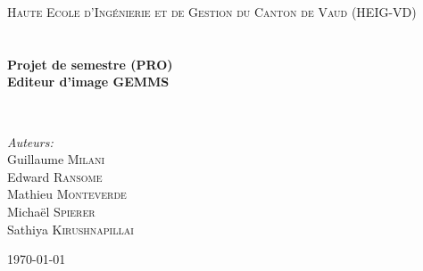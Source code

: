 \begin{titlepage}
\begin{center}


\textsc{\LARGE Haute Ecole d'Ingénierie et de Gestion du Canton de Vaud (HEIG-VD)}\\[1.8cm]

\textsc{\Large }\\[0.5cm]

\HRule \\[0.4cm]

{\huge \bfseries Projet de semestre (PRO)\\
Editeur d'image GEMMS \\[0.5cm] }

\HRule \\[1.5cm]

\begin{minipage}{0.4\textwidth}
\begin{flushleft} \large
\emph{Auteurs:}\\
Guillaume \textsc{Milani}\\
Edward \textsc{Ransome}\\
Mathieu \textsc{Monteverde}\\
Michaël \textsc{Spierer}\\
Sathiya \textsc{Kirushnapillai}
\end{flushleft}
\end{minipage}
\begin{minipage}{0.4\textwidth}
\begin{flushright} \large
\end{flushright}
\end{minipage}

\vfill

{\large \today}

\end{center}
\end{titlepage}
